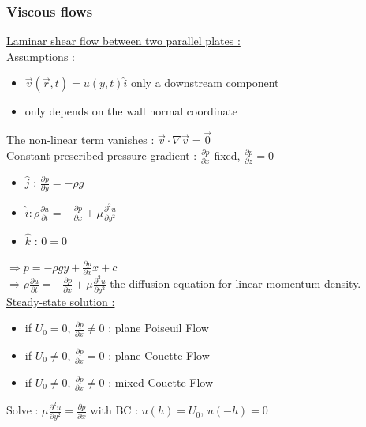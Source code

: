 \documentclass[../main.tex]{subfiles}
\begin{document}
\subsubsection{Viscous flows}
\quad \underline{Laminar shear flow between two parallel plates :}\\
Assumptions : \begin{itemize}
    \item $\Vec{v}(\Vec{r},t) = u(y,t) \hat{i}$ only a downstream component\\
    \item only depends on the wall normal coordinate\\
\end{itemize}
The non-linear term vanishes : $\Vec{v}\cdot \nabla \Vec{v} = \Vec{0}$\\

Constant prescribed pressure gradient : $\frac{\partial p}{\partial x}$ fixed, $\frac{\partial p}{\partial z} = 0$\\

\begin{itemize}
    \item $\hat{j}$ : $\frac{\partial p}{\partial y} = -\rho g$\\
    \item $\hat{i} : \rho \frac{\partial u}{\partial t} = -\frac{\partial p}{\partial x}+\mu \frac{\partial^2 u}{\partial y^2}$\\
    \item $\hat{k}$ : $0=0$\\
\end{itemize}
$\Rightarrow  p = -\rho g y + \frac{\partial p}{\partial x} x+c$\\
$\Rightarrow \rho \frac{\partial u}{\partial t} = -\frac{\partial p}{\partial x} + \mu \frac{\partial^2 u}{\partial y^2}$ the diffusion equation for linear momentum density.\\

\underline{Steady-state solution :} \begin{itemize}
    \item if $U_0 = 0$, $\frac{\partial p}{\partial x} \neq 0$ : plane Poiseuil Flow\\
    \item if $U_0 \neq 0$, $\frac{\partial p}{\partial x}= 0$ : plane Couette Flow\\
    \item if $U_0 \neq 0$, $\frac{\partial p}{\partial x} \neq 0$ : mixed Couette Flow\\
\end{itemize}
Solve : $\mu \frac{\partial^2 u}{\partial y^2} = \frac{\partial p}{\partial x}$ with BC : $u(h) = U_0$, $u(-h) = 0$\\
\end{document}

